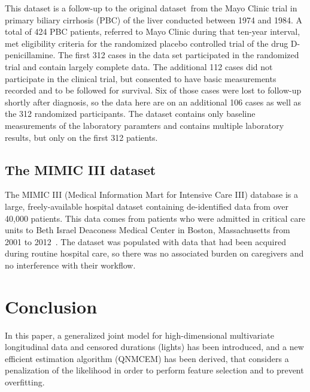 \documentclass[11pt]{article}
\begin{document}
This dataset is a follow-up to the original dataset~\citep{fleming2011counting, murtaugh1994primary}from the Mayo Clinic trial in primary biliary cirrhosis (PBC) of the liver conducted between 1974 and 1984. 
A total of 424 PBC patients, referred to Mayo Clinic during that ten-year interval, met eligibility criteria for the randomized placebo controlled trial of the drug D-penicillamine. The first 312 cases in the data set participated in the randomized trial and contain largely complete data. The additional 112 cases did not participate in the clinical trial, but consented to have basic measurements recorded and to be followed for survival. Six of those cases were lost to follow-up shortly after diagnosis, so the data here are on an additional 106 cases as well as the 312 randomized participants. 
The dataset contains only baseline measurements of the laboratory paramters and contains multiple laboratory results, but only on the first 312 patients. 


\subsection{The MIMIC III dataset}

The MIMIC III (Medical Information Mart for Intensive Care III) database is a large, freely-available hospital dataset containing de-identified data from over 40,000 patients. This data comes from patients who were admitted in critical care units to Beth Israel Deaconess Medical Center in Boston, Massachusetts from 2001 to 2012~\citep{johnson2016mimic}. The dataset was populated with data that had been acquired during routine hospital care, so there was no associated burden on caregivers and no interference with their workflow.



\section{Conclusion}
\label{sec:conclusion}

In this paper, a generalized joint model for high-dimensional multivariate longitudinal data and censored durations (lights) has been introduced, and a new efficient estimation
algorithm (QNMCEM) has been derived, that considers a penalization of the likelihood in order to perform feature
selection and to prevent overfitting.
\end{document}
